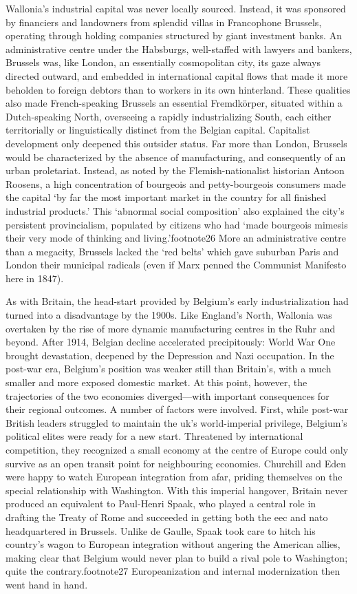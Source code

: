 \documentclass[
]{book}
\begin{document}
Wallonia's industrial capital was never locally sourced. Instead, it was sponsored by financiers and landowners from splendid villas in Francophone Brussels, operating through holding companies structured by giant investment banks. An administrative centre under the Habsburgs, well-staffed with lawyers and bankers, Brussels was, like London, an essentially cosmopolitan city, its gaze always directed outward, and embedded in international capital flows that made it more beholden to foreign debtors than to workers in its own hinterland. These qualities also made French-speaking Brussels an essential Fremdkörper, situated within a Dutch-speaking North, overseeing a rapidly industrializing South, each either territorially or linguistically distinct from the Belgian capital. Capitalist development only deepened this outsider status. Far more than London, Brussels would be characterized by the absence of manufacturing, and consequently of an urban proletariat. Instead, as noted by the Flemish-nationalist historian Antoon Roosens, a high concentration of bourgeois and petty-bourgeois consumers made the capital `by far the most important market in the country for all finished industrial products.' This `abnormal social composition' also explained the city's persistent provincialism, populated by citizens who had `made bourgeois mimesis their very mode of thinking and living.'footnote26 More an administrative centre than a megacity, Brussels lacked the `red belts' which gave suburban Paris and London their municipal radicals (even if Marx penned the Communist Manifesto here in 1847).

As with Britain, the head-start provided by Belgium's early industrialization had turned into a disadvantage by the 1900s. Like England's North, Wallonia was overtaken by the rise of more dynamic manufacturing centres in the Ruhr and beyond. After 1914, Belgian decline accelerated precipitously: World War One brought devastation, deepened by the Depression and Nazi occupation. In the post-war era, Belgium's position was weaker still than Britain's, with a much smaller and more exposed domestic market. At this point, however, the trajectories of the two economies diverged---with important consequences for their regional outcomes. A number of factors were involved. First, while post-war British leaders struggled to maintain the uk's world-imperial privilege, Belgium's political elites were ready for a new start. Threatened by international competition, they recognized a small economy at the centre of Europe could only survive as an open transit point for neighbouring economies. Churchill and Eden were happy to watch European integration from afar, priding themselves on the special relationship with Washington. With this imperial hangover, Britain never produced an equivalent to Paul-Henri Spaak, who played a central role in drafting the Treaty of Rome and succeeded in getting both the eec and nato headquartered in Brussels. Unlike de Gaulle, Spaak took care to hitch his country's wagon to European integration without angering the American allies, making clear that Belgium would never plan to build a rival pole to Washington; quite the contrary.footnote27 Europeanization and internal modernization then went hand in hand.
\end{document}
